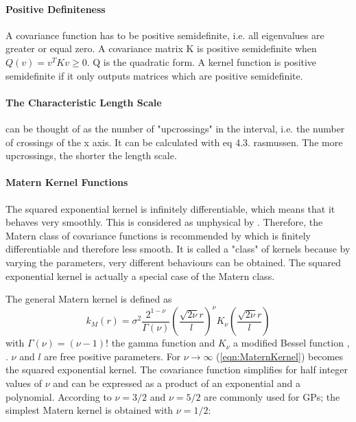 \documentclass[%
  a4paper,oneside,%
  11pt,%
  smallchapters,
  green,%
  rgb, <cmyk>
  ]{tubsbook}
\begin{document}
\paragraph{Positive Definiteness}A covariance function has to be positive semidefinite, i.e. all eigenvalues are greater or equal zero. A covariance matrix K is positive semidefinite when $Q(v) = v^T K v \geq 0$. Q is the quadratic form. A kernel function is positive semidefinite if it only outputs matrices which are positive semidefinite.


\paragraph{The Characteristic Length Scale} can be thought of as the number of "upcrossings" in the interval, i.e. the number of crossings of the x axis. It can be calculated with eq 4.3. rasmussen. The more upcrossings, the shorter the length scale.

\paragraph{Matern Kernel Functions}
\cite{rasmussen2006} The squared exponential kernel is infinitely differentiable, which means that it behaves very smoothly. This is considered as unphysical by \cite{stein1999}. Therefore, the Matern class of covariance functions \cite{matern2013} is recommended by \cite{stein1999} which is finitely differentiable and therefore less smooth. It is called a "class" of kernels because by varying the parameters, very different behaviours can be obtained. The squared exponential kernel is actually a special case of the Matern class.

The general Matern kernel is defined as
\begin{equation}
k_M(r) = \sigma^2 \frac{2^{1-\nu}}{\Gamma(\nu)}  \left( \frac{\sqrt{2\nu}r}{l}  \right)^{\nu} K_{\nu}  \left(  \frac{\sqrt{2\nu}r}{l}   \right)
\label{eqn:MaternKernel}
\end{equation}
with $\Gamma(\nu) = (\nu - 1)!$ the gamma function and $K_{\nu}$ a modified Bessel function \cite[p.84 ff.]{abramowitz2013}, \cite{rasmussen2006}. $\nu$ and $l$ are free positive parameters.
For $\nu \to \infty$  (\ref{eqn:MaternKernel}) becomes the squared exponential kernel.
The covariance function simplifies for half integer values of $\nu$ and can be expressed as a product of an exponential and a polynomial. According to \cite{rasmussen2006} $\nu = 3/2$ and $\nu = 5/2$ are commonly used for GPs; the simplest Matern kernel is obtained with $\nu = 1/2$:
\end{document}
